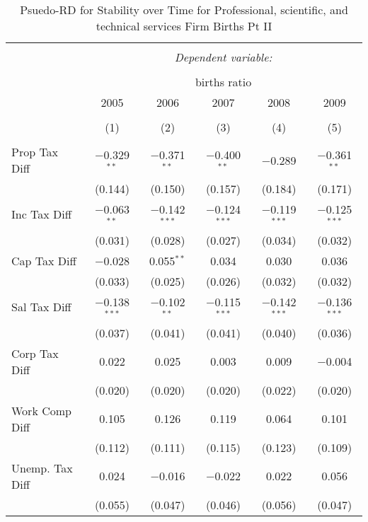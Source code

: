 
\begin{table}[!htbp] \centering 
  \caption{Psuedo-RD for Stability over Time for  Professional, scientific, and technical services Firm Births Pt II} 
  \label{54year} 
\small 
\begin{tabular}{@{\extracolsep{5pt}}lccccc} 
\\[-1.8ex]\hline 
\hline \\[-1.8ex] 
 & \multicolumn{5}{c}{\textit{Dependent variable:}} \\ 
\cline{2-6} 
\\[-1.8ex] & \multicolumn{5}{c}{births ratio} \\ 
 & 2005 & 2006 & 2007 & 2008 & 2009 \\ 
\\[-1.8ex] & (1) & (2) & (3) & (4) & (5)\\ 
\hline \\[-1.8ex] 
 Prop Tax Diff & $-$0.329$^{**}$ & $-$0.371$^{**}$ & $-$0.400$^{**}$ & $-$0.289 & $-$0.361$^{**}$ \\ 
  & (0.144) & (0.150) & (0.157) & (0.184) & (0.171) \\ 
  Inc Tax Diff & $-$0.063$^{**}$ & $-$0.142$^{***}$ & $-$0.124$^{***}$ & $-$0.119$^{***}$ & $-$0.125$^{***}$ \\ 
  & (0.031) & (0.028) & (0.027) & (0.034) & (0.032) \\ 
  Cap Tax Diff & $-$0.028 & 0.055$^{**}$ & 0.034 & 0.030 & 0.036 \\ 
  & (0.033) & (0.025) & (0.026) & (0.032) & (0.032) \\ 
  Sal Tax Diff & $-$0.138$^{***}$ & $-$0.102$^{**}$ & $-$0.115$^{***}$ & $-$0.142$^{***}$ & $-$0.136$^{***}$ \\ 
  & (0.037) & (0.041) & (0.041) & (0.040) & (0.036) \\ 
  Corp Tax Diff & 0.022 & 0.025 & 0.003 & 0.009 & $-$0.004 \\ 
  & (0.020) & (0.020) & (0.020) & (0.022) & (0.020) \\ 
  Work Comp Diff & 0.105 & 0.126 & 0.119 & 0.064 & 0.101 \\ 
  & (0.112) & (0.111) & (0.115) & (0.123) & (0.109) \\ 
  Unemp. Tax Diff & 0.024 & $-$0.016 & $-$0.022 & 0.022 & 0.056 \\ 
  & (0.055) & (0.047) & (0.046) & (0.056) & (0.047) \\ 

\end{tabular}
\end{table}
